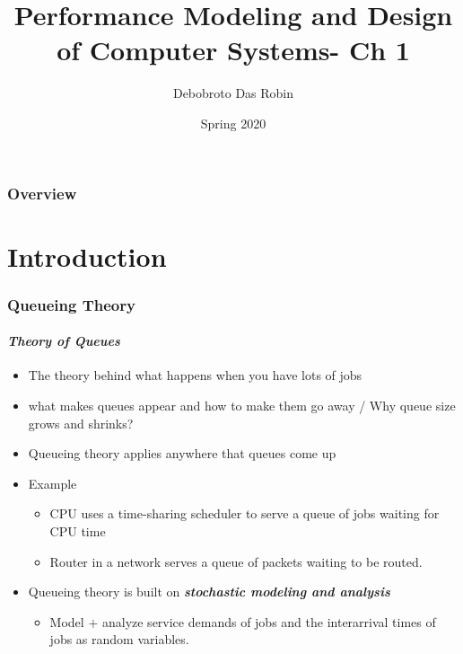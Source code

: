 \documentclass{beamer}
\title{Performance Modeling and
Design of Computer Systems- Ch 1}
\author{Debobroto Das Robin} %
\institute{Kent State University}
\date{Spring 2020}
\begin{document}
\begin{frame}
        \titlepage
        \begin{center}
    \href{mailto:drobin@kent.edu}{}
        \end{center}
\end{frame}

\begin{frame}
\frametitle{Overview} %
\tableofcontents %
\end{frame}
\section{Introduction}



\begin{frame}
    \frametitle{Queueing Theory}
    \framesubtitle{\textbf{\textit{Theory of Queues}}}
	\begin{itemize}
		\item The theory behind what happens when you have lots of jobs
		\item what makes queues appear and how to make them go away / Why queue 				size grows and shrinks?
		\item Queueing theory applies anywhere that queues come up
		\item Example
			\begin{itemize}
			\item CPU uses a time-sharing scheduler to serve a queue of jobs 						waiting for CPU time
			\item Router in a network serves a queue of packets waiting to be 						routed.
			\end{itemize}
		\item Queueing theory is built on  \textbf{\textit{stochastic modeling 					and analysis}} 						
				\begin{itemize}
					\item Model $+$ analyze  service demands of jobs and the 										interarrival times of jobs as random 											variables. 
				\end{itemize}		  
	\end{itemize}	    
    
\end{frame}
\end{document}

